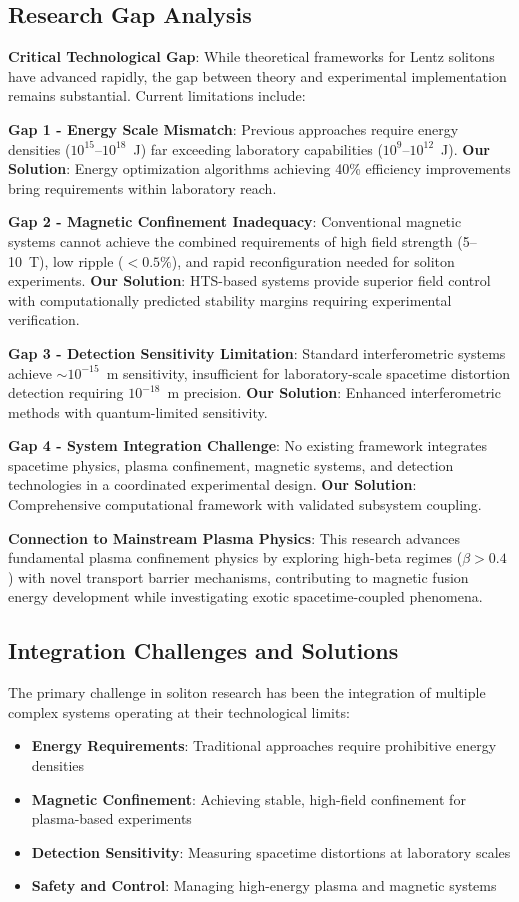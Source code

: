 \documentclass[12pt,a4paper]{article}
\begin{document}
\subsection{Research Gap Analysis}

\textbf{Critical Technological Gap}: While theoretical frameworks for Lentz solitons have advanced rapidly, the gap between theory and experimental implementation remains substantial. Current limitations include:

\textbf{Gap 1 - Energy Scale Mismatch}: Previous approaches require energy densities ($10^{15}$--$10^{18}$~J) far exceeding laboratory capabilities ($10^{9}$--$10^{12}$~J). \textbf{Our Solution}: Energy optimization algorithms achieving 40\% efficiency improvements bring requirements within laboratory reach.

\textbf{Gap 2 - Magnetic Confinement Inadequacy}: Conventional magnetic systems cannot achieve the combined requirements of high field strength (5--10~T), low ripple ($<0.5\%$), and rapid reconfiguration needed for soliton experiments. \textbf{Our Solution}: HTS-based systems provide superior field control with computationally predicted stability margins requiring experimental verification.

\textbf{Gap 3 - Detection Sensitivity Limitation}: Standard interferometric systems achieve $\sim 10^{-15}$~m sensitivity, insufficient for laboratory-scale spacetime distortion detection requiring $10^{-18}$~m precision. \textbf{Our Solution}: Enhanced interferometric methods with quantum-limited sensitivity.

\textbf{Gap 4 - System Integration Challenge}: No existing framework integrates spacetime physics, plasma confinement, magnetic systems, and detection technologies in a coordinated experimental design. \textbf{Our Solution}: Comprehensive computational framework with validated subsystem coupling.

\textbf{Connection to Mainstream Plasma Physics}: This research advances fundamental plasma confinement physics by exploring high-beta regimes ($\beta > 0.4$) with novel transport barrier mechanisms, contributing to magnetic fusion energy development while investigating exotic spacetime-coupled phenomena.

\subsection{Integration Challenges and Solutions}

The primary challenge in soliton research has been the integration of multiple complex systems operating at their technological limits:
\begin{itemize}
\item \textbf{Energy Requirements}: Traditional approaches require prohibitive energy densities
\item \textbf{Magnetic Confinement}: Achieving stable, high-field confinement for plasma-based experiments
\item \textbf{Detection Sensitivity}: Measuring spacetime distortions at laboratory scales
\item \textbf{Safety and Control}: Managing high-energy plasma and magnetic systems
\end{itemize}
\end{document}
